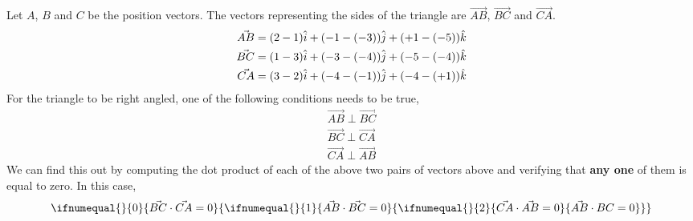 \begin{solution}[\fullpage]
Let $A$, $B$ and $C$ be the position vectors. The vectors 
representing the sides of the triangle are $\vec{AB}$, $\vec{BC}$
and $\vec{CA}$.
\begin{align}
  \vec{AB} &= (2 - 1)\hat{i} + (-1 - (-3))\hat{j} + (+1 - (-5))\hat{k} \\
  \vec{BC} &= (1 - 3)\hat{i} + (-3 - (-4))\hat{j} + (-5 - (-4))\hat{k} \\
  \vec{CA} &= (3 - 2)\hat{i} + (-4 - (-1))\hat{j} + (-4 - (+1))\hat{k}
\end{align}
For the triangle to be right angled, one of the following conditions
needs to be true,
\begin{align}
  \vec{AB} \perp \vec{BC} \\
  \vec{BC} \perp \vec{CA} \\
  \vec{CA} \perp \vec{AB}
\end{align}
We can find this out by computing the dot product of each of the above two pairs of vectors above and verifying 
that \textbf{any one} of them is equal to zero. In this case,
\begin{align}
\ifnumequal{\value{rolldice}}{0}{
  \vec{BC}\cdot\vec{CA} = 0
}{
  \ifnumequal{\value{rolldice}}{1}{
    \vec{AB}\cdot\vec{BC} = 0
  }{
    \ifnumequal{\value{rolldice}}{2}{
      \vec{CA}\cdot \vec{AB} = 0
    }{
      \vec{AB}\cdot{BC} = 0
    }
  }
}    
\end{align}

\end{solution}

